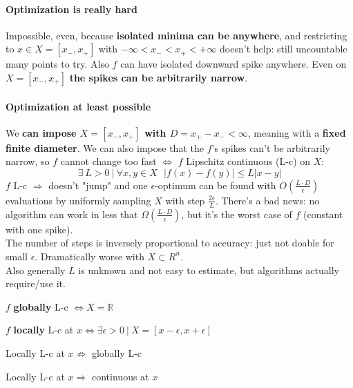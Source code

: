 \documentclass[10pt]{report}
\begin{document}
\paragraph{Optimization is really hard} Impossible, even, because \textbf{isolated minima can be anywhere}, and restricting to $x\in X=[x_-, x_+]$ with $-\infty<x_-<x_+<+\infty$ doesn't help: still uncountable many points to try. Also $f$ can have isolated downward spike anywhere. Even on $X = [x_-, x_+]$ \textbf{the spikes can be arbitrarily narrow}.
\paragraph{Optimization at least possible} We \textbf{can impose $X=[x_-,x_+]$ with $D = x_+-x_-<\infty$}, meaning with a \textbf{fixed finite diameter}. We can also impose that the $f$'s spikes can't be arbitrarily narrow, so $f$ cannot change too fast $\Leftrightarrow$ $f$ Lipschitz continuous (L-c) on $X$: $$\exists\: L > 0\:|\:\forall x,y\in X\:\:\:|f(x) - f(y)| \leq L|x - y|$$
$f$ L-c $\Rightarrow$ doesn't "jump" and one $\epsilon$-optimum can be found with $O(\frac{L\cdot D}{\epsilon})$ evaluations by uniformly sampling $X$ with step $\frac{2\epsilon}{L}$. There's a bad news: no algorithm can work in less that $\Omega(\frac{L\cdot D}{\epsilon})$, but it's the worst case of $f$ (constant with one spike).\\
The number of steps is inversely proportional to accuracy: just not doable for small $\epsilon$. Dramatically worse with $X\subset R^n$.\\
Also generally $L$ is unknown and not easy to estimate, but algorithms actually require/use it.
\begin{list}{}{}
	\item $f$ \textbf{globally} L-c $\Leftrightarrow X=\mathbb{R}$
	\item $f$ \textbf{locally} L-c at $x \Leftrightarrow \exists\epsilon >0\:|\:X=[x-\epsilon,x+\epsilon]$
	\item Locally L-c at $x \not\Rightarrow$ globally L-c
	\item Locally L-c at $x \Rightarrow$ continuous at $x$
\end{list}
\end{document}
